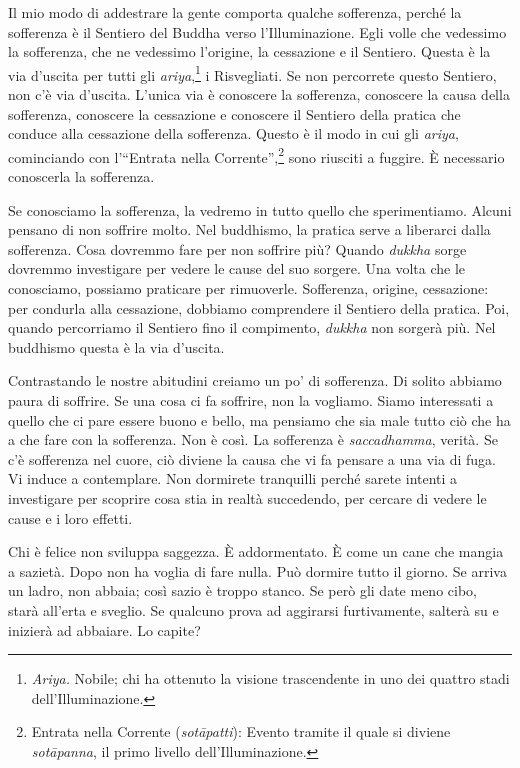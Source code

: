 Il mio modo di addestrare la gente comporta qualche sofferenza, perché
la sofferenza è il Sentiero del Buddha verso l'Illuminazione. Egli
volle che vedessimo la sofferenza, che ne vedessimo l'origine, la
cessazione e il Sentiero. Questa è la via d'uscita per tutti gli
\emph{ariya},\footnote{\emph{Ariya.} Nobile; chi ha ottenuto la visione
  trascendente in uno dei quattro stadi dell'Illuminazione.} i
Risvegliati. Se non percorrete questo Sentiero, non c'è via d'uscita.
L'unica via è conoscere la sofferenza, conoscere la causa della
sofferenza, conoscere la cessazione e conoscere il Sentiero della
pratica che conduce alla cessazione della sofferenza. Questo è il modo
in cui gli \emph{ariya}, cominciando con l'``Entrata nella
Corrente'',\footnote{Entrata nella Corrente (\emph{sotāpatti}): Evento
  tramite il quale si diviene \emph{sotāpanna}, il primo livello
  dell'Illuminazione.} sono riusciti a fuggire. È necessario conoscerla
la sofferenza.

Se conosciamo la sofferenza, la vedremo in tutto quello che
sperimentiamo. Alcuni pensano di non soffrire molto. Nel buddhismo, la
pratica serve a liberarci dalla sofferenza. Cosa dovremmo fare per non
soffrire più? Quando \emph{dukkha} sorge dovremmo investigare per vedere
le cause del suo sorgere. Una volta che le conosciamo, possiamo
praticare per rimuoverle. Sofferenza, origine, cessazione: per condurla
alla cessazione, dobbiamo comprendere il Sentiero della pratica. Poi,
quando percorriamo il Sentiero fino il compimento, \emph{dukkha} non
sorgerà più. Nel buddhismo questa è la via d'uscita.

Contrastando le nostre abitudini creiamo un po' di sofferenza. Di solito
abbiamo paura di soffrire. Se una cosa ci fa soffrire, non la vogliamo.
Siamo interessati a quello che ci pare essere buono e bello, ma pensiamo
che sia male tutto ciò che ha a che fare con la sofferenza. Non è così.
La sofferenza è \emph{saccadhamma}, verità. Se c'è sofferenza nel cuore,
ciò diviene la causa che vi fa pensare a una via di fuga. Vi induce a
contemplare. Non dormirete tranquilli perché sarete intenti a
investigare per scoprire cosa stia in realtà succedendo, per cercare di
vedere le cause e i loro effetti.

Chi è felice non sviluppa saggezza. È addormentato. È come un cane che
mangia a sazietà. Dopo non ha voglia di fare nulla. Può dormire tutto il
giorno. Se arriva un ladro, non abbaia; così sazio è troppo stanco. Se
però gli date meno cibo, starà all'erta e sveglio. Se qualcuno prova ad
aggirarsi furtivamente, salterà su e inizierà ad abbaiare. Lo capite?

